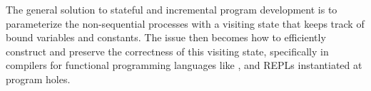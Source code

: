 The general solution to stateful and incremental program development is to parameterize the non-sequential processes with a visiting state that keeps track of bound variables and constants.
The issue then becomes how to efficiently construct and preserve the correctness of this visiting state, specifically in compilers for functional programming languages like \Beluga, and \acp{REPL} instantiated at program holes.

